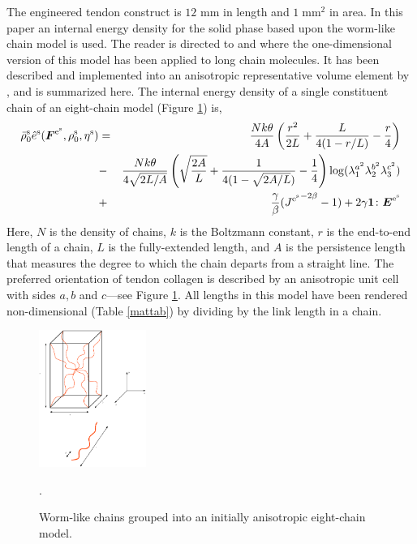 The engineered tendon construct is $12$ mm in length and
$1\;\mathrm{mm}^2$ in area. In this paper an internal energy
density for the solid phase based upon the worm-like chain model
is used. The reader is directed to \citet{Riefetal:97} and
\cite{Bustamanteetal:2003} where the one-dimensional version of
this model has been applied to long chain molecules. It has been
described and implemented into an anisotropic representative
volume element by \citet{Bischoffetal:2002}, and is summarized
here. The internal energy density of a single constituent chain of
an eight-chain model (Figure \ref{eightchain}) is,
\begin{eqnarray}
\bar{\rho}_0^\mathrm{s}\hat{e}^\mathrm{s}(\mbox{\boldmath$ F$}^{\mathrm{e}^\mathrm{s}},\rho_0^\mathrm{s},\eta^\mathrm{s})
&=& \frac{N k \theta}{4 A}\left(\frac{r^2}{2L} +
\frac{L}{4(1-r/L)} -
\frac{r}{4}\right)\nonumber\\
&-&\frac{N k \theta}{4\sqrt{2L/A}}\left(\sqrt{\frac{2A}{L}} +
\frac{1}{4(1 - \sqrt{2A/L})} -\frac{1}{4} \right)\log(\lambda_1^{a^2}\lambda_2^{b^2}\lambda_3^{c^2})\nonumber\\
&+& \frac{\gamma}{\beta}({J^{\mathrm{e}^\mathrm{s}}}^{-2\beta} -1)
+ 2\gamma{\bf 1}\colon\mbox{\boldmath$ E$}^{\mathrm{e}^\mathrm{s}} \label{wlcmeq}
\end{eqnarray}
\noindent Here, $N$ is the density of chains, $k$ is the Boltzmann
constant, $r$ is the end-to-end length of a chain, $L$ is the
fully-extended length, and $A$ is the persistence length that
measures the degree to which the chain departs from a straight
line. The preferred orientation of tendon collagen is described by
an anisotropic unit cell with sides $a,b$ and $c$---see Figure
\ref{eightchain}. All lengths in this model have been rendered
non-dimensional (Table \ref{mattab}) by dividing by the link
length in a chain.
\begin{figure}[ht]
   \centering
{\includegraphics[width=3.5cm]{images/wlcm-cuboid.eps}} \caption{Worm-like
chains grouped into an initially anisotropic eight-chain model.}
\label{eightchain}.
\end{figure}

